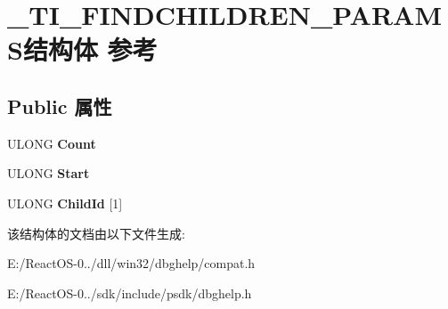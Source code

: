 \hypertarget{struct___t_i___f_i_n_d_c_h_i_l_d_r_e_n___p_a_r_a_m_s}{}\section{\+\_\+\+T\+I\+\_\+\+F\+I\+N\+D\+C\+H\+I\+L\+D\+R\+E\+N\+\_\+\+P\+A\+R\+A\+M\+S结构体 参考}
\label{struct___t_i___f_i_n_d_c_h_i_l_d_r_e_n___p_a_r_a_m_s}
\subsection*{Public 属性}
\begin{DoxyCompactItemize}
\item 
\mbox{\label{struct___t_i___f_i_n_d_c_h_i_l_d_r_e_n___p_a_r_a_m_s_a84551985c7bf077d3cf4720bff3b02a6}} 
U\+L\+O\+NG {\bfseries Count}
\item 
\mbox{\label{struct___t_i___f_i_n_d_c_h_i_l_d_r_e_n___p_a_r_a_m_s_a7b0424d6f4d7aef6d8aed6de53ccea65}} 
U\+L\+O\+NG {\bfseries Start}
\item 
\mbox{\label{struct___t_i___f_i_n_d_c_h_i_l_d_r_e_n___p_a_r_a_m_s_a68f509bcc7a4eb59ab5e17f0a6786fc1}} 
U\+L\+O\+NG {\bfseries Child\+Id} \mbox{[}1\mbox{]}
\end{DoxyCompactItemize}


该结构体的文档由以下文件生成\+:\begin{DoxyCompactItemize}
\item 
E\+:/\+React\+O\+S-\/0../dll/win32/dbghelp/compat.\+h\item 
E\+:/\+React\+O\+S-\/0../sdk/include/psdk/dbghelp.\+h\end{DoxyCompactItemize}
